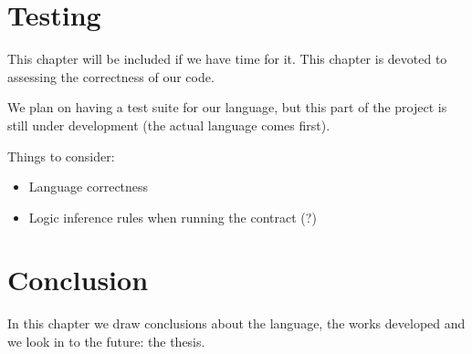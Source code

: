 \documentclass{ituthesis}
\begin{document}
\chapter{Testing}
This chapter will be included if we have time for it.
This chapter is devoted to assessing the correctness of our code.\par
We plan on having a test suite for our language, but this part of the project is still under development (the actual language comes first).\par
Things to consider:
\begin{itemize}
    \item Language correctness
    \item Logic inference rules when running the contract (?)
\end{itemize}


\chapter{Conclusion}
In this chapter we draw conclusions about the language, the works developed and we look in to the future: the thesis.





\printbibliography
\end{document}
